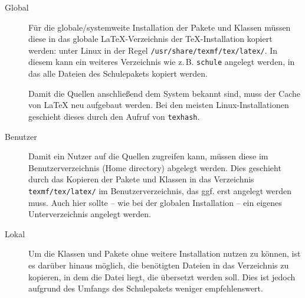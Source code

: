 \begin{description}
\item[Global]
	Für die globale/systemweite Installation der Pakete und
	Klassen	müssen diese in das globale \LaTeX-Verzeichnis der
	\TeX-Installation kopiert werden: unter Linux in der Regel
	\texttt{/usr/share/texmf/tex/latex/}. In diesem kann ein
	weiteres Verzeichnis wie z.\,B. \texttt{schule} angelegt
	werden, in das alle Dateien des Schulepakets
	kopiert werden. 
	
	Damit die Quellen anschließend dem System bekannt sind, muss
	der Cache von \LaTeX{} neu aufgebaut werden. Bei den meisten
	Linux-Installationen geschieht dieses durch den Aufruf von
	\texttt{texhash}.

\item[Benutzer]
	Damit ein Nutzer auf die Quellen zugreifen kann,
	müssen diese im Benutzerverzeichnis (Home directory)
	abgelegt werden. Dies geschieht durch das Kopieren der
	Pakete und Klassen in das Verzeichnis
	\texttt{texmf/tex/latex/} im Benutzerverzeichnis, das ggf.
	erst angelegt werden muss. Auch hier sollte -- wie bei der
	globalen Installation -- ein eigenes Unterverzeichnis
	angelegt werden.

\item[Lokal]
	Um die Klassen und Pakete ohne weitere Installation
	nutzen zu können, ist es darüber hinaus möglich, die
	benötigten Dateien in das Verzeichnis zu kopieren, in dem
	die Datei liegt, die übersetzt werden soll. Dies ist jedoch
	aufgrund des Umfangs des Schulepakets weniger empfehlenswert.
\end{description}


